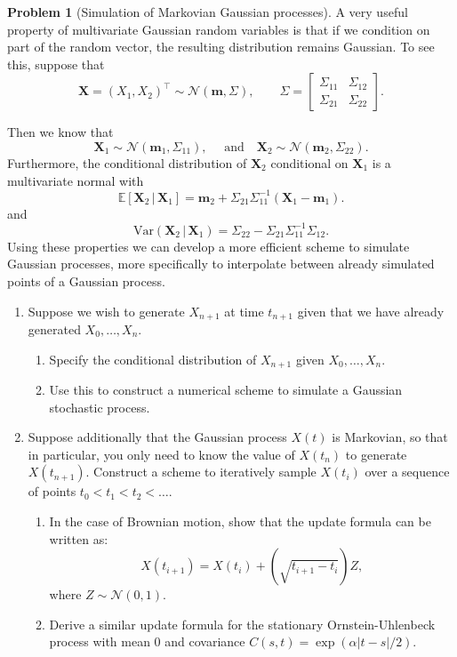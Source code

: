 \documentclass[11pt,a4paper]{article}
\theoremstyle{definition}
\newtheorem{problem}{Problem}
\theoremstyle{plain}
\begin{document}
\begin{problem}
    [Simulation of Markovian Gaussian processes]
A very useful property of multivariate Gaussian random variables is that if we condition on part of the random vector,  the resulting distribution remains Gaussian.  To see this, suppose that
\[
  \mathbf{X} =  (X_1,X_2)^\top \sim \mathcal{N}(\mathbf{m}, \Sigma),  \qquad 
  \Sigma = \left[\begin{array}{cc}\Sigma_{11} & \Sigma_{12} \\ \Sigma_{21} & \Sigma_{22}\end{array}\right].
\]

Then we know that
\[
  \mathbf{X}_1 \sim \mathcal{N}(\mathbf{m}_1, \Sigma_{11}),\quad \text{ and} \quad 
  \mathbf{X}_2 \sim \mathcal{N}(\mathbf{m}_2, \Sigma_{22}).
\]
Furthermore, the conditional distribution of $\mathbf{X}_2$ conditional on $\mathbf{X}_1$ is a multivariate normal with
\[
  \mathbb{E}[\mathbf{X}_2 \, | \, \mathbf{X}_1] = \mathbf{m}_2 + \Sigma_{21}\Sigma_{11}^{-1}(\mathbf{X}_1 - \mathbf{m}_1).
\]
and
\[
  \mbox{Var}(\mathbf{X}_2 \, | \, \mathbf{X}_1) = \Sigma_{22} - \Sigma_{21}\Sigma_{11}^{-1}\Sigma_{12}.
\]
Using these properties we can develop a more efficient scheme to simulate Gaussian processes, more specifically to interpolate between already simulated points of a Gaussian process.  

\begin{enumerate}
\item Suppose we wish to generate $X_{n+1}$ at time $t_{n+1}$ given that we have already generated $X_0, \ldots, X_n$. 
\begin{enumerate}
\item Specify the conditional distribution of $X_{n+1}$ given $X_0, \ldots, X_n$.  
\item Use this to construct a numerical scheme to simulate a Gaussian stochastic process.
\end{enumerate}
\item Suppose additionally that the Gaussian process $X(t)$ is Markovian, so that in particular, you only need to know the value of $X({t_n})$ to generate $X(t_{n+1})$.  Construct a scheme to iteratively sample $X(t_i)$ over a sequence of points $t_0 < t_1 < t_2 < \ldots.$
\begin{enumerate}
\item In the case of Brownian motion, show that the update formula can be written as:
$$
  X(t_{i+1}) = X(t_i) + \left(\sqrt{t_{i+1} - t_i}\right)Z,
$$
where $Z \sim \mathcal{N}(0,1)$.
\item Derive a similar update formula for the stationary Ornstein-Uhlenbeck process with mean $0$ and covariance $C(s,t) = \exp(\alpha|t-s|/2).$
\end{enumerate}
\end{enumerate}
\end{problem}
\end{document}
